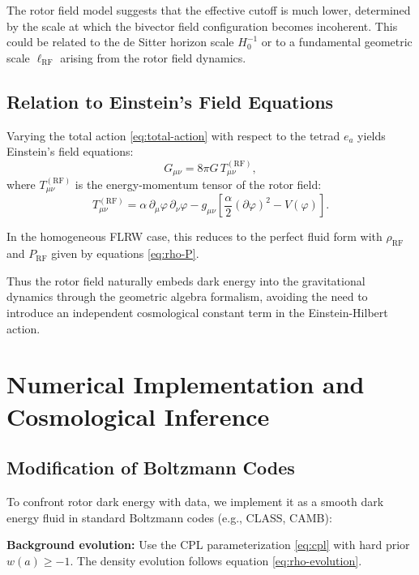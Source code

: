 \documentclass[11pt,a4paper]{article}
\numberwithin{equation}{section}
\theoremstyle{plain}
\theoremstyle{definition}
\theoremstyle{remark}
\begin{document}
The rotor field model suggests that the effective cutoff is much lower, determined by the scale at which the bivector field configuration becomes incoherent. This could be related to the de Sitter horizon scale $H_0^{-1}$ or to a fundamental geometric scale $\ell_{\mathrm{RF}}$ arising from the rotor field dynamics.

\subsection{Relation to Einstein's Field Equations}

Varying the total action \eqref{eq:total-action} with respect to the tetrad $e_a$ yields Einstein's field equations:
\begin{equation}
G_{\mu\nu} = 8\pi G\, T_{\mu\nu}^{(\mathrm{RF})},
\label{eq:einstein-rf}
\end{equation}
where $T_{\mu\nu}^{(\mathrm{RF})}$ is the energy-momentum tensor of the rotor field:
\begin{equation}
T_{\mu\nu}^{(\mathrm{RF})} = \alpha\,\partial_\mu\varphi\,\partial_\nu\varphi - g_{\mu\nu}\left[\frac{\alpha}{2}(\partial\varphi)^2 - V(\varphi)\right].
\end{equation}

In the homogeneous FLRW case, this reduces to the perfect fluid form with $\rho_{\mathrm{RF}}$ and $P_{\mathrm{RF}}$ given by equations \eqref{eq:rho-P}.

Thus the rotor field naturally embeds dark energy into the gravitational dynamics through the geometric algebra formalism, avoiding the need to introduce an independent cosmological constant term in the Einstein-Hilbert action.

\section{Numerical Implementation and Cosmological Inference}
\label{sec:numerical}

\subsection{Modification of Boltzmann Codes}

To confront rotor dark energy with data, we implement it as a smooth dark energy fluid in standard Boltzmann codes (e.g., CLASS, CAMB):

\textbf{Background evolution:} Use the CPL parameterization \eqref{eq:cpl} with hard prior $w(a) \geq -1$. The density evolution follows equation \eqref{eq:rho-evolution}.
\end{document}

